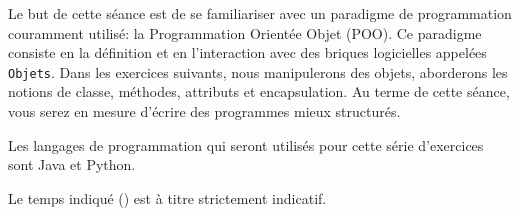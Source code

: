 
\usepackage{amsmath}



\ShowSolutiontrue
\ShowConseiltrue
\titre
{}

Le but de cette séance est de se familiariser avec un paradigme de programmation couramment utilisé: la Programmation Orientée Objet (POO). Ce paradigme consiste en la définition et en l'interaction avec des briques logicielles appelées \lstinline{Objets}. Dans les exercices suivants, nous manipulerons des objets, aborderons les notions de classe, méthodes, attributs et encapsulation. Au terme de cette séance, vous serez en mesure d'écrire des programmes mieux structurés.

Les langages de programmation qui seront utilisés pour cette série d'exercices sont Java et Python.

Le temps indiqué (\faClock) est à titre strictement indicatif.
